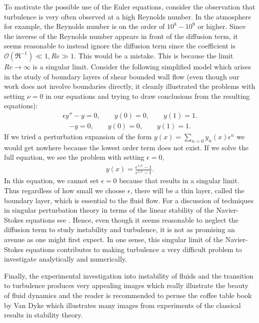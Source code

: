 To motivate the possible use of the Euler equations, consider the observation that turbulence is very often observed at a high Reynolds number. In the atmosphere for example, the Reynolds number is on the order of $10^{8}-10^{9}$ or higher. Since the inverse of the Reynolds number appears in front of the diffusion term, it seems reasonable to instead ignore the diffusion term since the coefficient is $\mathcal{O}(\Re^{-1}) \ll 1, Re\gg 1$. This would be a mistake. This is because the limit $Re\rightarrow\infty$ is a singular limit. Consider the following simplified model which arises in the study of boundary layers of shear bounded wall flow \cite{acheson_fluid,benderorszag,kundu} (even though our work does not involve boundaries directly, it cleanly illustrated the problems with setting $\nu=0$ in our equations and trying to draw conclusions from the resulting equations):
\begin{align}
\epsilon y'' - y =0, \qquad y(0)=0,\qquad y(1)=1.
\end{align}
\begin{align}
- y =0, \qquad y(0)=0,\qquad y(1)=1.
\end{align}
 If we tried a perturbation expansion of the form $y(x) =\sum_{n=0}y_{n}(x)\epsilon^{n}$ we would get nowhere because the lowest order term does not exist. If we solve the full equation, we see the problem with  setting $\epsilon=0$,
\begin{align}
y(x) = \frac{e^{x/\epsilon}-1}{e^{1/\epsilon}-1}.
\end{align}
In this equation, we cannot set $\epsilon=0$ because that results in a singular limit. Thus regardless of how small we choose $\epsilon$, there will be a thin layer, called the boundary layer, which is essential to the fluid flow. For a discussion of techniques in singular perturbation theory in terms of the linear stability of the Navier-Stokes equations see \cite{drazinreid,vandyke}. Hence, even though it seems reasonable to neglect the diffusion term to study instability and turbulence, it is not as promising an avenue as one might first expect. In one sense, this singular limit of the Navier-Stokes equations contributes to making turbulence a very difficult problem to investigate analytically and numerically. 

Finally, the experimental investigation into instability of fluids and the transition to turbulence produces very appealing images which really illustrate the beauty of fluid dynamics and the reader is recommended to peruse the coffee table book by Van Dyke \cite{vandykealbum} which illustrates many images from experiments of the classical results in stability theory. 

